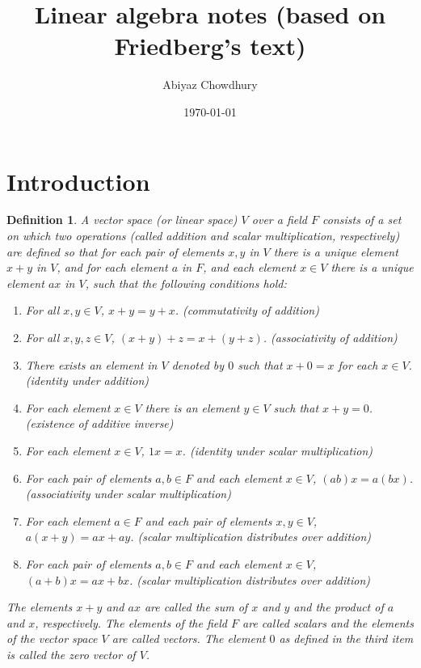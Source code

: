 \documentclass[a4paper]{article}
\title{\textbf{Linear algebra notes (based on Friedberg's text)}}
\author{Abiyaz Chowdhury }
\date{\today}
\newtheorem{mydef}{Definition}
\numberwithin{mytheorem}{section}
\numberwithin{mydef}{section}
\numberwithin{example}{section}
\begin{document}
\maketitle

\section{Introduction}

\begin{mydef} A vector space (or linear space) $V$ over a field $F$ consists of a set on which two operations (called addition and scalar multiplication, respectively) are defined so that for each pair of elements $x,y$ in $V$ there is a unique element $x + y$ in $V$, and for each element $a$ in $F$, and each element $x \in V$ there  is a unique element $ax$ in $V$, such that the following conditions hold:
\begin{enumerate}
\item For all $x,y \in V$, $x + y = y + x$. (commutativity of addition)
\item For all $x,y,z \in V$, $(x + y) + z = x + (y+z)$. (associativity of addition)
\item There exists an element in $V$ denoted by $0$ such that $x + 0 = x$ for each $x \in V$. (identity under addition)
\item For each element $x \in V$ there is an element $y \in V$ such that $x + y = 0$. (existence of additive inverse)
\item For each element $x \in V$, $1x = x$. (identity under scalar multiplication)
\item For each pair of elements $a,b \in F$ and  each element $x \in V$, $(ab)x = a(bx)$. (associativity under scalar multiplication) 
\item For each element $a \in F$ and each pair of elements $x,y \in V$, $a(x + y) = ax + ay$. (scalar multiplication distributes over addition)
\item For each pair of elements $a, b \in F$ and each element $x \in V$, $(a+b)x = ax + bx$. (scalar multiplication distributes over addition)
\end{enumerate}
The elements $x+y$ and $ax$ are called the sum of $x$ and $y$ and the product of $a$ and $x$, respectively. The elements of the field $F$ are called scalars and the elements of the vector space $V$ are called vectors. The element $0$ as defined in the third item is called the zero vector of $V$.
\end{mydef}
\end{document}
